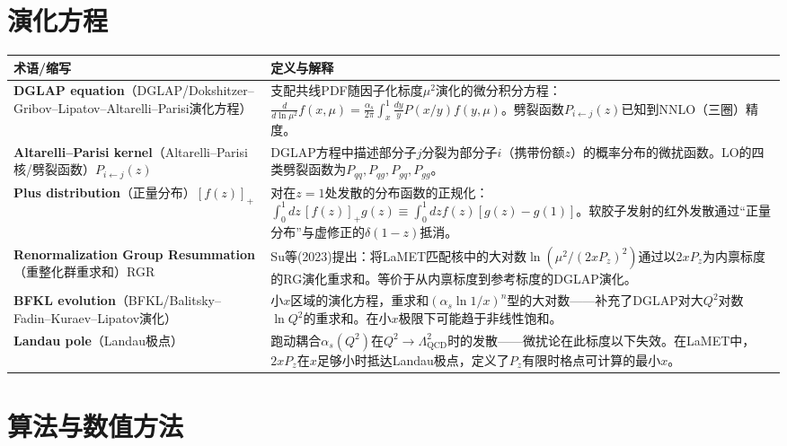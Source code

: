 \documentclass[12pt,a4paper]{ctexart}
\begin{document}
\section{演化方程}

\begin{longtable}{p{3.5cm}p{9cm}}
\toprule
\textbf{术语/缩写} & \textbf{定义与解释} \\
\midrule
\endhead
\textbf{DGLAP equation}（DGLAP/Dokshitzer--Gribov--Lipatov--Altarelli--Parisi演化方程）& 支配共线PDF随因子化标度$\mu^2$演化的微分积分方程：$\frac{d}{d\ln\mu^2} f(x,\mu) = \frac{\alpha_s}{2\pi}\int_x^1 \frac{dy}{y} P(x/y) f(y,\mu)$。劈裂函数$P_{i\leftarrow j}(z)$已知到NNLO（三圈）精度。\\
\textbf{Altarelli--Parisi kernel}（Altarelli--Parisi核/劈裂函数）$P_{i\leftarrow j}(z)$& DGLAP方程中描述部分子$j$分裂为部分子$i$（携带份额$z$）的概率分布的微扰函数。LO的四类劈裂函数为$P_{qq}, P_{qg}, P_{gq}, P_{gg}$。\\
\textbf{Plus distribution}（正量分布）$[f(z)]_+$& 对在$z=1$处发散的分布函数的正规化：$\int_0^1 dz\, [f(z)]_+ g(z) \equiv \int_0^1 dz f(z)[g(z)-g(1)]$。软胶子发射的红外发散通过``正量分布''与虚修正的$\delta(1-z)$抵消。\\
\textbf{Renormalization Group Resummation}（重整化群重求和）RGR& Su等(2023)提出：将LaMET匹配核中的大对数$\ln(\mu^2/(2xP_z)^2)$通过以$2xP_z$为内禀标度的RG演化重求和。等价于从内禀标度到参考标度的DGLAP演化。\\
\textbf{BFKL evolution}（BFKL/Balitsky--Fadin--Kuraev--Lipatov演化）& 小$x$区域的演化方程，重求和$(\alpha_s \ln 1/x)^n$型的大对数——补充了DGLAP对大$Q^2$对数$\ln Q^2$的重求和。在小$x$极限下可能趋于非线性饱和。\\
\textbf{Landau pole}（Landau极点）& 跑动耦合$\alpha_s(Q^2)$在$Q^2 \to \Lambda_{\text{QCD}}^2$时的发散——微扰论在此标度以下失效。在LaMET中，$2xP_z$在$x$足够小时抵达Landau极点，定义了$P_z$有限时格点可计算的最小$x$。\\
\bottomrule
\end{longtable}

\section{算法与数值方法}
\end{document}
